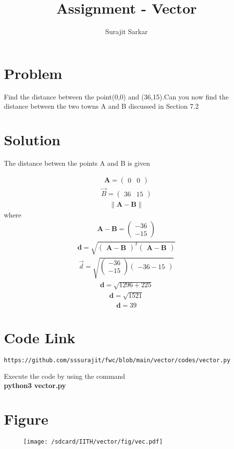 \documentclass[journal,12pt,twocolumn]{IEEEtran}
\title{\mytitle}
\title{
Assignment - Vector
}
\author{Surajit Sarkar}
\newcommand{\myvec}[1]{\ensuremath{\begin{pmatrix}#1\end{pmatrix}}}
\providecommand{\norm}[1]{\lVert#1\rVert}
\let\vec\mathbf
\begin{document}
\maketitle
\tableofcontents
\bigskip
\section{\textbf{Problem}}
Find the distance between the point(0,0) and (36,15).Can you now find the distance between the two towns A and B discussed in Section 7.2
\section{\textbf{Solution}}
The distance betwen the points A and B is given


\begin{align*}
       \vec A=\myvec{0 & 0}
\end{align*}   
\begin{align*}
       \Vec B=\myvec{36 & 15}
 \end{align*}
 \begin{align*}
     \norm{\vec{A}-\vec{B}}
 \end{align*}
       where 
 \begin{align*}
     \vec{A}-\vec{B}=\myvec{-36\\-15}
 \end{align*}      
\begin{align*}
    \vec d=\sqrt{\myvec{\vec{A}-\vec{B}}^T\myvec{\vec{A}-\vec{B}}}
\end{align*}
\begin{align*}
    \Vec d =\sqrt{\myvec{-36\\-15}{\myvec{-36-15}}}
\end{align*}
\begin{align*}
    \vec d=\sqrt{1296+225}
\end{align*}
\begin{align*}
    \vec d=\sqrt{1521}
\end{align*}
\begin{align*}
    \vec d=39
\end{align*}
\section{\textbf{Code Link}}
\begin{lstlisting}
https://github.com/sssurajit/fwc/blob/main/vector/codes/vector.py
\end{lstlisting}
Execute the code by using the command\\
\textbf{python3 vector.py}
\section{\textbf{Figure}}
\begin{figure}[!h]
    \centering
\texttt{[image: /sdcard/IITH/vector/fig/vec.pdf]}
\captionsetup{labelformat=empty}
\caption{}
\label{fig:vec}
\end{figure}
\end{document}
